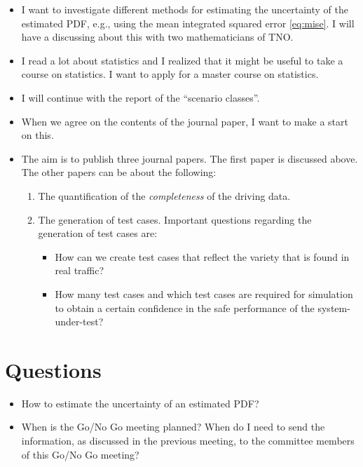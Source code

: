 \documentclass[10pt,final,a4paper,oneside,onecolumn]{article}
\begin{document}
\begin{itemize}
	\item I want to investigate different methods for estimating the uncertainty of the estimated PDF, e.g., using the mean integrated squared error \cref{eq:mise}. I will have a discussing about this with two mathematicians of TNO.
	\item I read a lot about statistics and I realized that it might be useful to take a course on statistics. I want to apply for a master course on statistics.
	\item I will continue with the report of the ``scenario classes''. 
	\item When we agree on the contents of the journal paper, I want to make a start on this.
	\item The aim is to publish three journal papers. The first paper is discussed above. The other papers can be about the following:
	\begin{enumerate}
		\item The quantification of the \emph{completeness} of the driving data.
		\item The generation of test cases. Important questions regarding the generation of test cases are:
		\begin{itemize}
			\item How can we create test cases that reflect the variety that is found in real traffic?
			\item How many test cases and which test cases are required for simulation to obtain a certain confidence in the safe performance of the system-under-test?
		\end{itemize}
	\end{enumerate}
\end{itemize}

\section{Questions}

\begin{itemize}
	\item How to estimate the uncertainty of an estimated PDF?
	\item When is the Go/No Go meeting planned? When do I need to send the information, as discussed in the previous meeting, to the committee members of this Go/No Go meeting?
\end{itemize}


\printbibliography

\newpage

\end{document}
